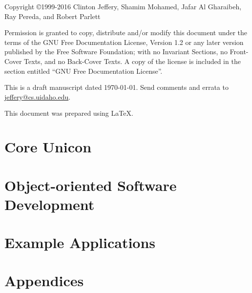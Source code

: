 \documentclass[letterpaper,twoside,12pt]{book}
\begin{document}
\thispagestyle{empty}
\bigskip
\bigskip
Copyright \copyright 1999-2016 Clinton Jeffery, Shamim Mohamed,
Jafar Al Gharaibeh, Ray Pereda, and Robert Parlett

Permission is granted to copy, distribute and/or modify this document under the
terms of the GNU Free Documentation License, Version 1.2 or any later version
published by the Free Software Foundation; with no Invariant Sections, no
Front-Cover Texts, and no Back-Cover Texts. A copy of the license is included in
the section entitled ``GNU Free Documentation License''.
\bigskip


This is a draft manuscript dated \today.  Send comments and errata
to \linebreak \href{mailto:jeffery@cs.uidaho.edu}{jeffery@cs.uidaho.edu}.

\bigskip
This document was prepared using \LaTeX.
\clearpage

\frontmatter
\setcounter{tocdepth}{2}
\tableofcontents


\mainmatter



\part{Core Unicon}











\part{Object-oriented Software Development}







\part{Example Applications}








\part{Appendices}
\appendix







% 

\backmatter


\small
\printindex
\end{document}
